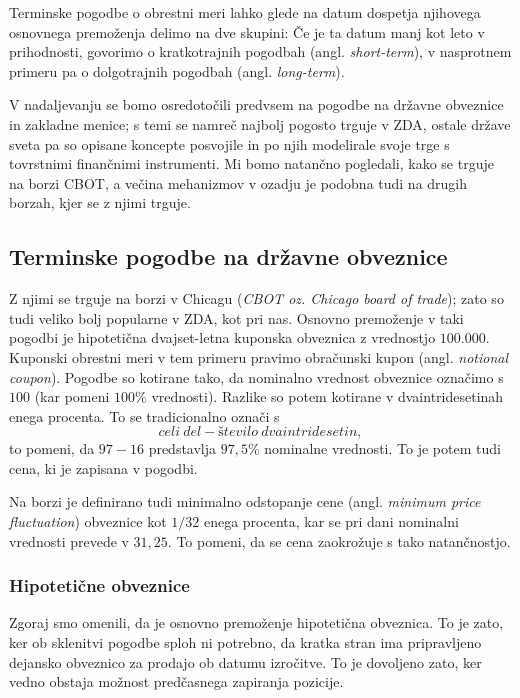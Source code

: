 \documentclass[a4paper]{article}
\begin{document}

Terminske pogodbe o obrestni meri lahko glede na datum dospetja njihovega osnovnega premoženja delimo na 
dve skupini: Če je ta datum manj kot leto v prihodnosti, govorimo o kratkotrajnih pogodbah (angl. 
\textit{short-term}), v nasprotnem primeru pa o dolgotrajnih pogodbah (angl. \textit{long-term}). 

V nadaljevanju se bomo osredotočili predvsem na pogodbe na državne obveznice in zakladne menice; s temi
se namreč najbolj pogosto trguje v ZDA, ostale države sveta pa so opisane koncepte posvojile in po njih
modelirale svoje trge s tovrstnimi finančnimi instrumenti. Mi bomo natančno pogledali, kako se trguje na
borzi CBOT, a večina mehanizmov v ozadju je podobna tudi na drugih borzah, kjer se z njimi trguje.

\subsection{Terminske pogodbe na državne obveznice}
Z njimi se trguje na borzi v Chicagu (\textit{CBOT oz. Chicago board of trade}); zato so tudi veliko 
bolj popularne v ZDA, kot pri nas. Osnovno premoženje v taki pogodbi je hipotetična dvajset-letna 
kuponska obveznica z vrednostjo \textdollar$100.000$. Kuponski obrestni meri v tem primeru pravimo 
obračunski kupon (angl. \textit{notional coupon}). Pogodbe so kotirane tako, da nominalno vrednost 
obveznice označimo s $100$ (kar pomeni $100\%$ vrednosti). Razlike so potem kotirane v dvaintridesetinah 
enega procenta. To se tradicionalno označi s 
%
$$ celi\:del - število\:dvaintridesetin, $$
%
to pomeni, da $97-16$ predstavlja $97,5\%$ nominalne vrednosti. To je potem tudi cena, ki je zapisana v 
pogodbi.

Na borzi je definirano tudi minimalno odstopanje cene (angl. \textit{minimum price fluctuation}) obveznice
kot $1/32$ enega procenta, kar se pri dani nominalni vrednosti prevede v \textdollar$31,25.$ To pomeni, da
se cena zaokrožuje s tako natančnostjo.

\subsubsection{Hipotetične obveznice}
Zgoraj smo omenili, da je osnovno premoženje hipotetična obveznica. To je zato, ker ob sklenitvi pogodbe 
sploh ni potrebno, da kratka stran ima pripravljeno dejansko obveznico za prodajo ob datumu izročitve.
To je dovoljeno zato, ker vedno obstaja možnost predčasnega zapiranja pozicije. 
\end{document}
